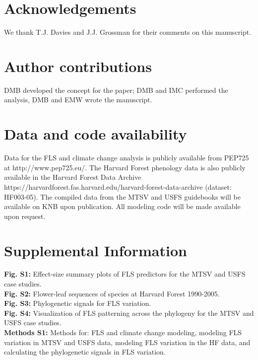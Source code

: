\documentclass[11pt]{article}
\begin{document}

\section*{Acknowledgements}
\noindent We thank T.J. Davies and J.J. Grossman for their comments on this manuscript.

\section*{Author contributions}
DMB developed the concept for the paper; DMB and IMC performed the analysis, DMB and EMW wrote the manuscript.

\section*{Data and code availability}
Data for the FLS and climate change analysis is publicly available from PEP725 at http://www.pep725.eu/. The Harvard Forest phenology data is also publicly available in the Harvard Forest Data Archive https://harvardforest.fas.harvard.edu/harvard-forest-data-archive (dataset: HF003-05). The compiled data from the MTSV and USFS guidebooks will be available on KNB upon publication. All modeling code will be made available upon request. %




\newpage
\section*{Supplemental Information}
\textbf{Fig. S1:} Effect-size summary plots of FLS predictors for the MTSV and USFS case studies. \\
\textbf{Fig. S2:} Flower-leaf sequences of species at Harvard Forest 1990-2005.\\
\textbf{Fig. S3:} Phylogenetic signals for FLS variation.\\
\textbf{Fig. S4:} Visualization of FLS patterning across the phylogeny for the MTSV and USFS case studies.\\
\textbf{Methods S1:} Methods for: FLS and climate change modeling, modeling FLS variation in MTSV and USFS data, modeling FLS variation in the HF data, and calculating the phylogenetic signals in FLS variation.
\newpage
\end{document}
